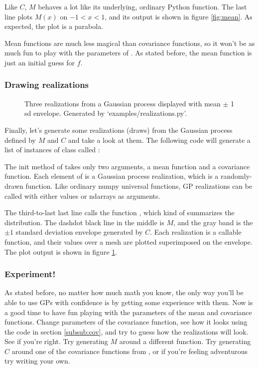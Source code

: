 \documentclass{manual}
\begin{document}
Like $C$, $M$ behaves a lot like its underlying, ordinary Python function. The last line plots $M(x)$ on $-1<x<1$, and its output is shown in figure \ref{fig:mean}. As expected, the plot is a parabola. 

Mean functions are much less magical than covariance functions, so it won't be as much fun to play with the parameters of . As stated before, the mean function is just an initial guess for $f$.

\subsubsection{Drawing realizations}\label{subsub:realizations}
\begin{figure}
	\centering
	\caption{Three realizations from a Gaussian process displayed with mean $\pm$ 1 sd envelope. Generated by {\sffamily `examples/realizations.py'}.}
	\label{fig:realizations}
\end{figure}

Finally, let's generate some realizations (draws) from the Gaussian process defined by $M$ and $C$ and take a look at them. The following code will generate a list of instances of class  called :


The init method of  takes only two arguments, a mean function and a covariance function. Each element of  is a Gaussian process realization, which is a randomly-drawn function. Like ordinary numpy universal functions, GP realizations can be called with either values or ndarrays as arguments.

The third-to-last last line calls the function , which kind of summarizes the distribution. The dashdot black line in the middle is $M$, and the gray band is the $\pm 1$ standard deviation envelope generated by $C$. Each realization is a callable function, and their values over a mesh are plotted superimposed on the envelope. The plot output is shown in figure \ref{fig:realizations}. 

\subsubsection{Experiment!} 

As stated before, no matter how much math you know, the only way you'll be able to use GPs with confidence is by getting some experience with them. Now is a good time to have fun playing with the parameters of the mean and covariance functions. Change parameters of the covariance function, see how it looks using the code in section \ref{subsub:cov}, and try to guess how the realizations will look. See if you're right. Try generating $M$ around a different function. Try generating $C$ around one of the covariance functions from , or if you're feeling adventurous try writing your own. 
\end{document}
